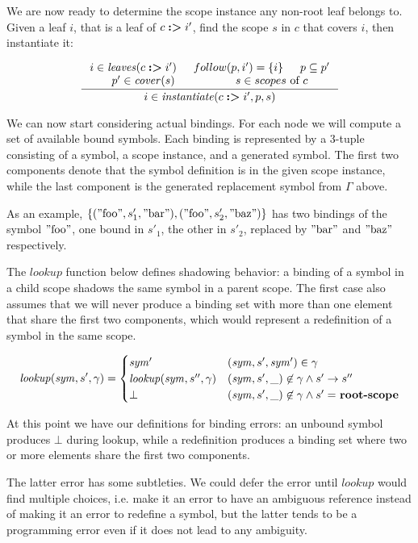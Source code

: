 \documentclass{kththesis}
\begin{document}
We are now ready to determine the scope instance any non-root leaf belongs to. Given a leaf $i$, that is a leaf of $c \mathrel{\textbf{:>}} i'$, find the scope $s$ in $c$ that covers $i$, then instantiate it:

$$
\inference{
  i \in \leaves(c \tagged i') &
  follow(p, i') = \{i\} &
  p \subseteq p' \\
  p' \in \cover(s) &
  s \in scopes \text{ of } c
}{i \in \instantiate(c \tagged i', p, s)}
$$

We can now start considering actual bindings. For each node we will compute a set of available bound symbols. Each binding is represented by a 3-tuple consisting of a symbol, a scope instance, and a generated symbol. The first two components denote that the symbol definition is in the given scope instance, while the last component is the generated replacement symbol from $\Gamma$ above.

As an example, $\{(\text{''foo''}, s'_1, \text{''bar''}), (\text{''foo''}, s'_2, \text{''baz''})\}$ has two bindings of the symbol $\text{''foo''}$, one bound in $s'_1$, the other in $s'_2$, replaced by $\text{''bar''}$ and $\text{''baz''}$ respectively.

\newcommand{\lookup}{\ensuremath{\mathit{lookup}}}

The $\lookup$ function below defines shadowing behavior: a binding of a symbol in a child scope shadows the same symbol in a parent scope. The first case also assumes that we will never produce a binding set with more than one element that share the first two components, which would represent a redefinition of a symbol in the same scope.

$$
\lookup(\mathit{sym}, s', \gamma) =
\begin{cases}
\mathit{sym}' & (\mathit{sym}, s', \mathit{sym}') \in \gamma \\
\lookup(\mathit{sym}, s'', \gamma) & (\mathit{sym}, s', \_) \not\in \gamma \land s' -> s'' \\
\bot & (\mathit{sym}, s', \_) \not\in \gamma \land s' =\ \rootscope
\end{cases}
$$

At this point we have our definitions for binding errors: an unbound symbol produces $\bot$ during lookup, while a redefinition produces a binding set where two or more elements share the first two components.

The latter error has some subtleties. We could defer the error until $\lookup$ would find multiple choices, i.e. make it an error to have an ambiguous reference instead of making it an error to redefine a symbol, but the latter tends to be a programming error even if it does not lead to any ambiguity.
\end{document}
